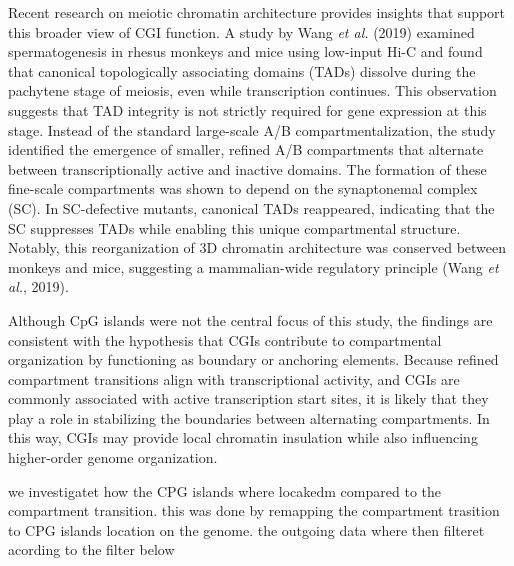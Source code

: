 \documentclass[
  a4paper,
  openany]{scrbook}
\begin{document}
Recent research on meiotic chromatin architecture provides insights that
support this broader view of CGI function. A study by Wang \emph{et al.}
(2019) examined spermatogenesis in rhesus monkeys and mice using
low-input Hi-C and found that canonical topologically associating
domains (TADs) dissolve during the pachytene stage of meiosis, even
while transcription continues. This observation suggests that TAD
integrity is not strictly required for gene expression at this stage.
Instead of the standard large-scale A/B compartmentalization, the study
identified the emergence of smaller, refined A/B compartments that
alternate between transcriptionally active and inactive domains. The
formation of these fine-scale compartments was shown to depend on the
synaptonemal complex (SC). In SC-defective mutants, canonical TADs
reappeared, indicating that the SC suppresses TADs while enabling this
unique compartmental structure. Notably, this reorganization of 3D
chromatin architecture was conserved between monkeys and mice,
suggesting a mammalian-wide regulatory principle (Wang \emph{et al.},
2019).

Although CpG islands were not the central focus of this study, the
findings are consistent with the hypothesis that CGIs contribute to
compartmental organization by functioning as boundary or anchoring
elements. Because refined compartment transitions align with
transcriptional activity, and CGIs are commonly associated with active
transcription start sites, it is likely that they play a role in
stabilizing the boundaries between alternating compartments. In this
way, CGIs may provide local chromatin insulation while also influencing
higher-order genome organization.

we investigatet how the CPG islands where locakedm compared to the
compartment transition. this was done by remapping the compartment
trasition to CPG islands location on the genome. the outgoing data where
then filteret acording to the filter below
\end{document}
